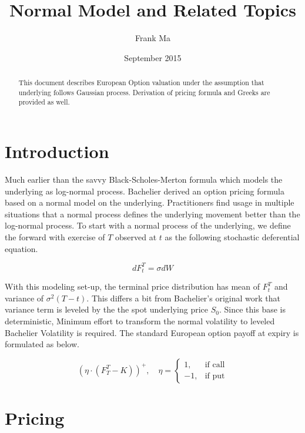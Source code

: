 \documentclass{article}
\title{Normal Model and Related Topics}
\author{Frank Ma}
\date{September 2015}
\begin{document}
\maketitle

\begin{abstract}
    This document describes European Option valuation under the assumption that underlying follows Gaussian process.
    Derivation of pricing formula and Greeks are provided as well.
\end{abstract}


\section{Introduction}

Much earlier than the savvy Black-Scholes-Merton formula which models the underlying as log-normal process.
Bachelier derived an option pricing formula based on a normal model on the underlying.
Practitioners find usage in multiple situations that a normal process defines the underlying movement better than the log-normal process.
To start with a normal process of the underlying, we define the forward with exercise of $ T $ observed at $ t $ as the following stochastic deferential equation. 

\begin{equation} \label{Bachelier SDE}
    dF_t^T = \sigma dW
\end{equation}

With this modeling set-up, the terminal price distribution has mean of $ F_t^T $ and variance of $ \sigma^2 \left(T - t\right) $.
This differs a bit from Bachelier's original work that variance term is leveled by the the spot underlying price $ S_0 $.
Since this base is deterministic, Minimum effort to transform the normal volatility to leveled Bachelier Volatility is required.
The standard European option payoff at expiry is formulated as below.

\begin{equation} \label{Option Payoff}
    \left(\eta \cdot \left(F_T^T - K\right) \right)^+, \quad
    \eta =
    \begin{cases} 
        1, & \mbox{if call} \\
        -1, & \mbox{if put}
    \end{cases}
\end{equation}


\section{Pricing}
\end{document}

